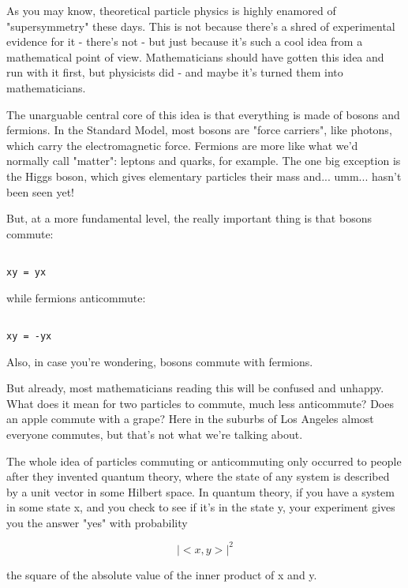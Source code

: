 


As you may know, theoretical particle physics is highly enamored of 
"supersymmetry" these days.  This is not because there's a shred of 
experimental evidence for it - there's not - but just because it's such
a cool idea from a mathematical point of view.  Mathematicians should
have gotten this idea and run with it first, but physicists did - and
maybe it's turned them into mathematicians.

The unarguable central core of this idea is that everything is made of 
bosons and fermions.  In the Standard Model, most bosons are "force 
carriers", like photons, which carry the electromagnetic force.  Fermions 
are more like what we'd normally call "matter": leptons and quarks, 
for example.  The one big exception is the Higgs boson, which gives elementary 
particles their mass and... umm... hasn't been seen yet! 

But, at a more fundamental level, the really important thing is that
bosons commute:


\begin{verbatim}

xy = yx
\end{verbatim}
    
while fermions anticommute:


\begin{verbatim}

xy = -yx
\end{verbatim}
    
Also, in case you're wondering, bosons commute with fermions.

But already, most mathematicians reading this will be confused and unhappy.
What does it mean for two particles to commute, much less anticommute?  
Does an apple commute with a grape?   Here in the suburbs of Los Angeles 
almost everyone commutes, but that's not what we're talking about. 

The whole idea of particles commuting or anticommuting only occurred to 
people after they invented quantum theory, where the state of any 
system is described by a unit vector in some Hilbert space.  In quantum
theory, if you have a system in some state x, and you check to see if
it's in the state y, your experiment gives you the answer "yes" with
probability 


$$

|<x,y>|^{2}
$$
    
the square of the absolute value of the inner product of x and y.

